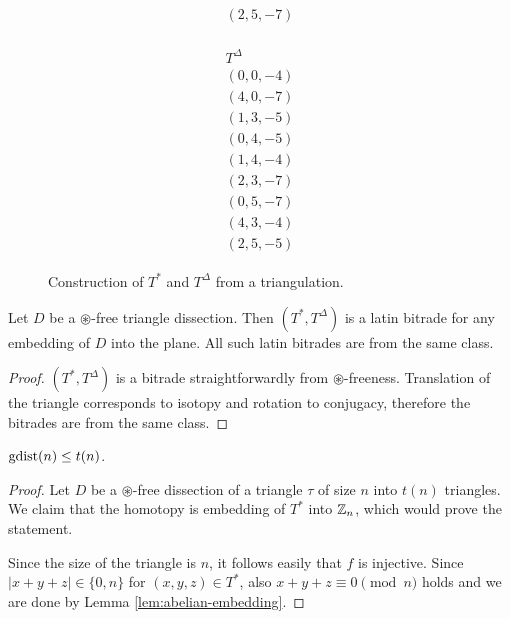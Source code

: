 \begin{exmp}
\begin{figure}[htb]
\begin{minipage}{.16\linewidth}
\begin{align*}
\begin{array}{c}
				(2,5,-7)
			\end{array}
		\end{align*}
	\end{minipage}
	\hspace{.04\linewidth}
	\begin{minipage}{.16\linewidth}
		\begin{align*}
			\begin{array}{c}
				T^\Delta \\ \hline
				(0,0,-4) \\
				(4,0,-7) \\
				(1,3,-5) \\
				(0,4,-5) \\
				(1,4,-4) \\
				(2,3,-7) \\
				(0,5,-7) \\
				(4,3,-4) \\
				(2,5,-5)
			\end{array}
		\end{align*}
	\end{minipage}
	\caption{Construction of $T^*$ and $T^\Delta$ from a triangulation.}
	\label{fig:arrows}
\end{figure}
\end{exmp}%

\begin{lem}
Let $D$ be a $\circledast$-free triangle dissection. Then $(T^*, T^\Delta)$ is a latin bitrade for any embedding of $D$ into the plane. All such latin bitrades are from the same class.
\end{lem}
\begin{proof}
 $(T^*, T^\Delta)$ is a bitrade straightforwardly from $\circledast$-freeness. Translation of the triangle corresponds to isotopy and rotation to conjugacy, therefore the bitrades are from the same class.
\end{proof}

\begin{lem}
\label{lem:gdist-leq-tn}
$\mathop{\mathrm{gdist}}(n) \leq t(n)$.
\end{lem}
\begin{proof}
Let $D$ be a $\circledast$-free dissection of a triangle $\tau$ of size $n$ into $t(n)$ triangles. We claim that the homotopy
%
is embedding of $T^*$ into $\mathbb Z_n$, which would prove the statement.

Since the size of the triangle is $n$, it follows easily that $f$ is injective. Since $|x+y+z| \in \{0,n\}$ for $(x,y,z)\in T^*$, also $x+y+z \equiv 0 \pmod n$ holds and we are done by Lemma \ref{lem:abelian-embedding}.
\end{proof}

